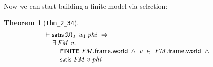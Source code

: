 \documentclass[letterpaper]{article}
\newtheorem{thm}{Theorem}
\renewcommand{\HOLConst}[1]{{\textsf{\upshape\small #1}}}
\newenvironment{holmath}{\begin{displaymath}\begin{array}{l}}{\end{array}\end{displaymath}\ignorespacesafterend}
\begin{document}
Now we can start building a finite model via selection:
\begin{thm}[\texttt{thm_2_34}]
\begin{holmath}
  \ensuremath{\HOLTokenTurnstile}\HOLConst{satis}\;\HOLFreeVar{\ensuremath{\mathfrak{M}\sb{1}}}\;\HOLFreeVar{w\sb{\mathrm{1}}}\;\HOLFreeVar{phi}\;\HOLSymConst{\HOLTokenImp{}}\\
\;\;\;\;\;\HOLSymConst{\HOLTokenExists{}}\HOLBoundVar{FM}\;\HOLBoundVar{v}.\\
\;\;\;\;\;\;\;\;\;\HOLConst{FINITE}\;\HOLBoundVar{FM}.\HOLFieldName{frame}.\HOLFieldName{world}\;\HOLSymConst{\HOLTokenConj{}}\;\HOLBoundVar{v}\;\HOLSymConst{\HOLTokenIn{}}\;\HOLBoundVar{FM}.\HOLFieldName{frame}.\HOLFieldName{world}\;\HOLSymConst{\HOLTokenConj{}}\\
\;\;\;\;\;\;\;\;\;\HOLConst{satis}\;\HOLBoundVar{FM}\;\HOLBoundVar{v}\;\HOLFreeVar{phi}
\end{holmath}
\end{thm}
\end{document}
